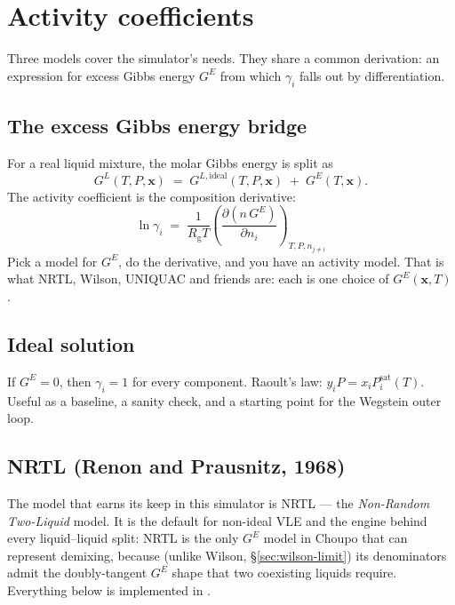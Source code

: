 \documentclass[11pt,a4paper]{article}
\newcommand{\Rgas}{R_{\!\mathrm{g}}}                %
\newcommand{\Psat}{P^{\mathrm{sat}}}
\newcommand{\Gex}{G^{E}}
\newcommand{\xv}{\mathbf{x}}
\begin{document}
\section{Activity coefficients}\label{ch:activity}

\begin{whatyoulllearn}
Three models cover the simulator's needs. They share a
common derivation: an expression for excess Gibbs energy $\Gex$ from
which $\gamma_i$ falls out by differentiation.
\end{whatyoulllearn}

\subsection{The excess Gibbs energy bridge}

For a real liquid mixture, the molar Gibbs energy is split as
\begin{equation}
   G^L(T, P, \xv) \;=\; G^{L,\mathrm{ideal}}(T, P, \xv) \;+\; \Gex(T, \xv).
\end{equation}
The activity coefficient is the composition derivative:
\begin{equation}
   \boxed{\;
   \ln \gamma_i \;=\; \frac{1}{\Rgas T}\left(\frac{\partial (n\,\Gex)}{\partial n_i}\right)_{T,P,n_{j \ne i}}
   \;}
   \label{eq:gamma-from-GE}
\end{equation}
Pick a model for $\Gex$, do the derivative, and you have an activity
model. That is what NRTL, Wilson, UNIQUAC and friends are: each is one
choice of $\Gex(\xv, T)$.

\subsection{Ideal solution}

If $\Gex = 0$, then $\gamma_i = 1$ for every component. Raoult's law:
$y_i P = x_i \Psat_i(T)$. Useful as a baseline, a sanity check, and a
starting point for the Wegstein outer loop.

\subsection{NRTL (Renon and Prausnitz, 1968)}\label{sec:nrtl}

The model that earns its keep in this simulator is NRTL --- the
\emph{Non-Random Two-Liquid} model. It is the default for non-ideal
VLE and the engine behind every liquid--liquid split: NRTL is the only
$\Gex$ model in Choupo that can represent demixing, because (unlike
Wilson, \S\ref{sec:wilson-limit}) its denominators admit the
doubly-tangent $\Gex$ shape that two coexisting liquids require.
Everything below is implemented in
.
\end{document}
